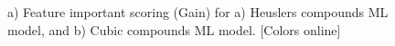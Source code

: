 \documentclass[article]{elsarticle}
\begin{document}
\begin{figure}[H]
    \centering
        \quad
\caption{a) Feature important scoring (Gain) for a) Heuslers compounds ML model, and b) Cubic compounds ML model. [Colors online]}
\label{fig:MLmodelFI}
\end{figure}

\end{document}
